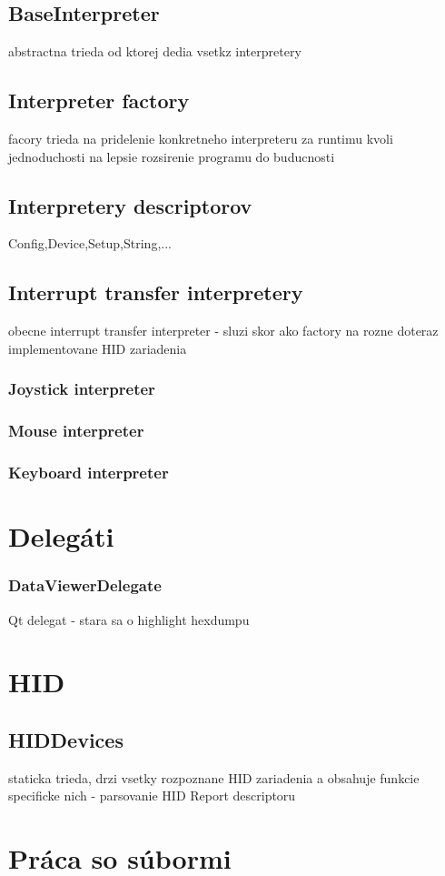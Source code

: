 \subsection{BaseInterpreter}
abstractna trieda od ktorej dedia vsetkz interpretery
\subsection{Interpreter factory}
facory trieda na pridelenie konkretneho interpreteru za runtimu kvoli jednoduchosti na lepsie rozsirenie programu do buducnosti
\subsection{Interpretery descriptorov}
Config,Device,Setup,String,...
\subsection{Interrupt transfer interpretery}
obecne interrupt transfer interpreter - sluzi skor ako factory na rozne doteraz implementovane HID zariadenia
\subsubsection{Joystick interpreter}
\subsubsection{Mouse interpreter}
\subsubsection{Keyboard interpreter}
\section{Delegáti}
\subsubsection{DataViewerDelegate}
Qt delegat - stara sa o highlight hexdumpu
\section{HID}
\subsection{HIDDevices}
staticka trieda, drzi vsetky rozpoznane HID zariadenia a obsahuje funkcie specificke nich - parsovanie HID Report descriptoru
\section{Práca so súbormi}
